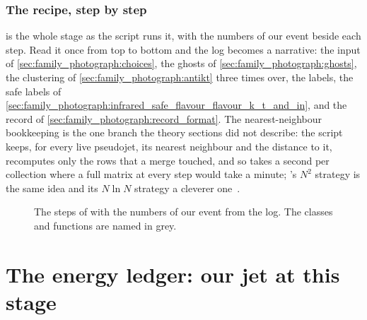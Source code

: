 \subsubsection{The recipe, step by step}
\label{sec:family_photograph:step_by_step}

 is the whole stage as the script runs
it, with the numbers of our event beside each step. Read it once from top
to bottom and the  log becomes a narrative: the input of
\cref{sec:family_photograph:choices}, the ghosts of
\cref{sec:family_photograph:ghosts}, the clustering of
\cref{sec:family_photograph:antikt} three times over, the labels, the
safe labels of
\cref{sec:family_photograph:infrared_safe_flavour_flavour_k_t_and_in}, and
the record of \cref{sec:family_photograph:record_format}. The
nearest-neighbour bookkeeping is the one branch the theory sections did
not describe: the script keeps, for every live pseudojet, its nearest
neighbour and the distance to it, recomputes only the rows that a merge
touched, and so takes a second per collection where a full matrix at
every step would take a minute; \FASTJET's $N^2$ strategy is the same
idea and its $N\ln N$ strategy a cleverer one~\cite{Cacciari:2011ma}.

\begin{figure}[htbp]\centering
\resizebox{\textwidth}{!}{}
\caption[The GenJet stage as a flow chart]{The steps of
 with the numbers of our event from the
 log. The classes and functions are named in grey.}
\label{fig:family_photograph:flow}
\end{figure}

\section{The energy ledger: our jet at this stage}
\label{sec:family_photograph:our_jet_at_this_stage_the_reference_genj}

